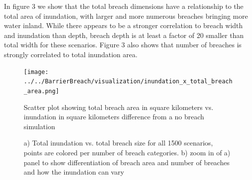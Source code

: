 \documentclass{coastal_paper}
\begin{document}
In figure 3 we show that the total breach dimensions have a relationship to the total area of inundation, with larger and more numerous breaches bringing more water inland. While there appears to be a stronger correlation to breach width and inundation than depth, breach depth is at least a factor of 20 smaller than total width for these scenarios.
Figure 3 also shows that number of breaches is strongly correlated to total inundation area. 



\begin{figure}
    \centering
    \texttt{[image: ../../BarrierBreach/visualization/inundation\_x\_total\_breach\_area.png]}
    \caption{Scatter plot showing total breach area in square kilometers vs. inundation in square kilometers difference from a no breach simulation}
    \hspace{.5cm}
    \label{fig3}
    \caption{ a) Total inundation vs. total breach size for all 1500 scenarios, points are colored per number of breach categories. b) zoom in of a) panel to show differentiation of breach area and number of breaches and how the inundation can vary}
    \end{figure}
\end{document}
